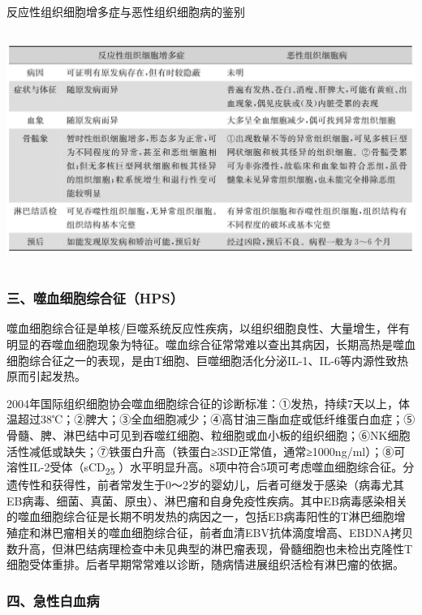 \begin{table}[htbp]
\centering
\caption{反应性组织细胞增多症与恶性组织细胞病的鉴别}
\label{tab2-19}
\includegraphics[width=5.90625in,height=3.02083in]{./images/Image00025.jpg}
\end{table}

\subsubsection{三、噬血细胞综合征（HPS）}

噬血细胞综合征是单核/巨噬系统反应性疾病，以组织细胞良性、大量增生，伴有明显的吞噬血细胞现象为特征。噬血综合征常常难以查出其病因，长期高热是噬血细胞综合征之一的表现，是由T细胞、巨噬细胞活化分泌IL-1、IL-6等内源性致热原而引起发热。

2004年国际组织细胞协会噬血细胞综合征的诊断标准：①发热，持续7天以上，体温超过38℃；②脾大；③全血细胞减少；④高甘油三酯血症或低纤维蛋白血症；⑤骨髓、脾、淋巴结中可见到吞噬红细胞、粒细胞或血小板的组织细胞；⑥NK细胞活性减低或缺失；⑦铁蛋白升高（铁蛋白≥3SD正常值，通常≥1000ng/ml）；⑧可溶性IL-2受体（sCD\textsubscript{25}
）水平明显升高。8项中符合5项可考虑噬血细胞综合征。分遗传性和获得性，前者常发生于0～2岁的婴幼儿，后者可继发于感染（病毒尤其EB病毒、细菌、真菌、原虫）、淋巴瘤和自身免疫性疾病。其中EB病毒感染相关的噬血细胞综合征是长期不明发热的病因之一，包括EB病毒阳性的T淋巴细胞增殖症和淋巴瘤相关的噬血细胞综合征，前者血清EBV抗体滴度增高、EBDNA拷贝数升高，但淋巴结病理检查中未见典型的淋巴瘤表现，骨髓细胞也未检出克隆性T细胞受体重排。后者早期常常难以诊断，随病情进展组织活检有淋巴瘤的依据。

\subsubsection{四、急性白血病}

